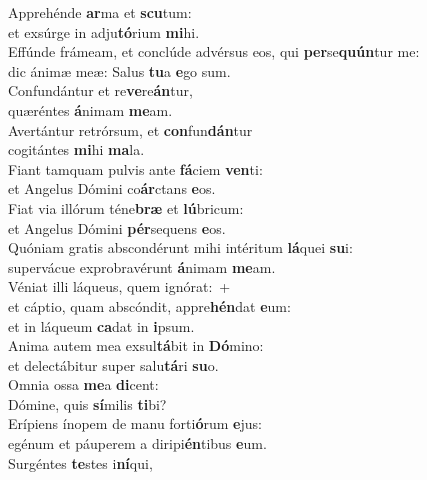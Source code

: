 \evenverse Apprehénde \textbf{ar}ma et \textbf{scu}tum:~\*\\
\evenverse et exsúrge in adju\textbf{tó}rium \textbf{mi}hi.\\
\oddverse Effúnde frámeam, et conclúde advérsus eos, qui \textbf{per}se\textbf{quún}tur me:~\*\\
\oddverse dic ánimæ meæ: Salus \textbf{tu}a \textbf{e}go sum.\\
\evenverse Confundántur et re\textbf{ve}re\textbf{án}tur,~\*\\
\evenverse quæréntes \textbf{á}nimam \textbf{me}am.\\
\oddverse Avertántur retrórsum, et \textbf{con}fun\textbf{dán}tur~\*\\
\oddverse cogitántes \textbf{mi}hi \textbf{ma}la.\\
\evenverse Fiant tamquam pulvis ante \textbf{fá}ciem \textbf{ven}ti:~\*\\
\evenverse et Angelus Dómini co\textbf{ár}ctans \textbf{e}os.\\
\oddverse Fiat via illórum téne\textbf{bræ} et \textbf{lú}bricum:~\*\\
\oddverse et Angelus Dómini \textbf{pér}sequens \textbf{e}os.\\
\evenverse Quóniam gratis abscondérunt mihi intéritum \textbf{lá}quei \textbf{su}i:~\*\\
\evenverse supervácue exprobravérunt \textbf{á}nimam \textbf{me}am.\\
\oddverse Véniat illi láqueus, quem ignórat:~+\\
\oddverse  et cáptio, quam abscóndit, appre\textbf{hén}dat \textbf{e}um:~\*\\
\oddverse et in láqueum \textbf{ca}dat in \textbf{i}psum.\\
\evenverse Anima autem mea exsul\textbf{tá}bit in \textbf{Dó}mino:~\*\\
\evenverse et delectábitur super salu\textbf{tá}ri \textbf{su}o.\\
\oddverse Omnia ossa \textbf{me}a \textbf{di}cent:~\*\\
\oddverse Dómine, quis \textbf{sí}milis \textbf{ti}bi?\\
\evenverse Erípiens ínopem de manu forti\textbf{ó}rum \textbf{e}jus:~\*\\
\evenverse egénum et páuperem a diripi\textbf{én}tibus \textbf{e}um.\\
\oddverse Surgéntes \textbf{te}stes i\textbf{ní}qui,~\*\\
